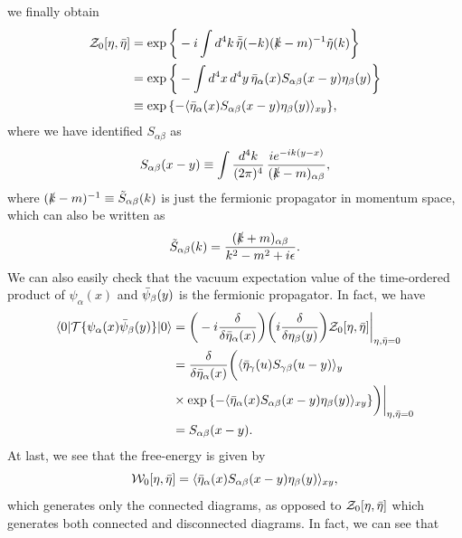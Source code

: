 we finally obtain 
\begin{equation}
    \begin{split}
        \PF_0[\eta,\b{\eta}] &= \exp{\bigg\{-i\int d^4k\,\b{\t{\eta}}(-k)(\sl{k} - m)^{-1}\t{\eta}(k)\bigg\}} \\
        &= \exp{\bigg\{-\int d^4x\,d^4y\,\b{\eta}_\alpha(x)S_{\alpha\beta}(x - y)\eta_\beta(y)\bigg\}} \\
        &\equiv \exp{\{-\vmedio{\b{\eta}_\alpha(x)S_{\alpha\beta}(x - y)\eta_\beta(y)}_{xy}\}},
    \end{split}
\end{equation}
where we have identified $S_{\alpha\beta}$ as 
\begin{equation}
    S_{\alpha\beta}(x - y) \equiv \int \frac{d^4k}{(2\pi)^4}\,\frac{ie^{-ik(y - x)}}{(\sl{k} - m)_{\alpha\beta}},
\end{equation}
where $(\sl{k} - m)^{-1} \equiv \t{S}_{\alpha\beta}(k)$ is just the fermionic propagator in momentum space, which can also be written as 
\begin{equation}
    \t{S}_{\alpha\beta}(k) = \frac{(\sl{k} + m)_{\alpha\beta}}{k^2 - m^2 + i\epsilon}.
\end{equation}
We can also easily check that the vacuum expectation value of the time-ordered product of $\psi_\alpha(x)$ and $\b{\psi}_\beta(y)$ is the fermionic propagator. In fact, we have 
\begin{equation}
    \begin{split}
        \mybrakett{0}{\TO{\psi_\alpha(x)\b{\psi}_\beta(y)}}{0} &= \bigg(-i\frac{\delta}{\delta\b{\eta}_\alpha(x)}\bigg)\bigg(i\frac{\delta}{\delta\eta_\beta(y)}\bigg)\PF_0[\eta,\b{\eta}]\bigg|_{\eta,\b{\eta} = 0} \\
        &= \frac{\delta}{\delta\b{\eta}_\alpha(x)}\bigg(\vmedio{\b{\eta}_\gamma(u)S_{\gamma\beta}(u - y)}_y \\
        &\times\exp{\{-\vmedio{\b{\eta}_\alpha(x)S_{\alpha\beta}(x - y)\eta_\beta(y)}_{xy}\}}\bigg)\bigg|_{\eta,\b{\eta} = 0} \\
        &= S_{\alpha\beta}(x - y).
    \end{split}
\end{equation}
At last, we see that the free-energy is given by 
\begin{equation}
    \HE_0[\eta,\b{\eta}] = \vmedio{\b{\eta}_\alpha(x)S_{\alpha\beta}(x - y)\eta_\beta(y)}_{xy},
\end{equation}
which generates only the connected diagrams, as opposed to $\PF_0[\eta,\b{\eta}]$ which generates both connected and disconnected diagrams. In fact, we can see that 
